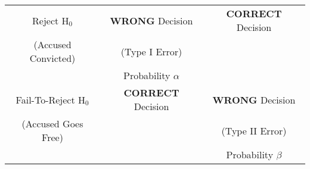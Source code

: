\documentclass[11pt, english]{article}
\begin{document}
\begin{table}[h]
\begin{center}
\begin{tabular}{p{4cm}p{4cm}p{4cm}}
                        \hline
                        \multicolumn{1}{c|}{Reject H$_0$} & \multicolumn{1}{c|}{\textbf{WRONG} Decision} & \multicolumn{1}{c}{\textbf{CORRECT} Decision}\\
                        \multicolumn{1}{c|}{(Accused Convicted)} & \multicolumn{1}{c|}{(Type I Error)} & \\
                        & \multicolumn{1}{|c|}{Probability $\alpha$} & \\
                        \hline
                        \multicolumn{1}{c|}{Fail-To-Reject H$_0$} & \multicolumn{1}{c|}{\textbf{CORRECT} Decision} & \multicolumn{1}{c}{\textbf{WRONG} Decision}\\
                        \multicolumn{1}{c|}{(Accused Goes Free)} & & \multicolumn{1}{|c}{(Type II Error)}\\
                        & \multicolumn{1}{|c|}{} & \multicolumn{1}{c}{Probability $\beta$}\\
                        \hline
                \end{tabular}
                \end{center}
                \end{table}
\end{document}
